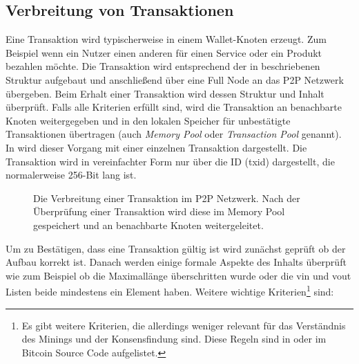 \documentclass[ngerman,runningheads,a4paper]{llncs}[2018/03/10]
\begin{document}
\subsection{Verbreitung von Transaktionen}\label{sec:transaktionsverbreitung}

Eine Transaktion wird typischerweise in einem Wallet-Knoten erzeugt. Zum Beispiel wenn ein Nutzer einen anderen für einen Service oder ein Produkt bezahlen möchte. Die Transaktion wird entsprechend der in  beschriebenen Struktur aufgebaut und anschließend über eine Full Node an das P2P Netzwerk übergeben. Beim Erhalt einer Transaktion wird dessen Struktur und Inhalt überprüft. Falls alle Kriterien erfüllt sind, wird die Transaktion an benachbarte Knoten weitergegeben und in den lokalen Speicher für unbestätigte Transaktionen übertragen (auch \textit{Memory Pool} oder \textit{Transaction Pool} genannt). In  wird dieser Vorgang mit einer einzelnen Transaktion dargestellt. Die Transaktion wird in vereinfachter Form nur über die ID (txid) dargestellt, die normalerweise 256-Bit lang ist.

\begin{figure}
  \centering
  \caption{Die Verbreitung einer Transaktion im P2P Netzwerk. Nach der Überprüfung einer Transaktion wird diese im Memory Pool gespeichert und an benachbarte Knoten weitergeleitet.}
  \label{fig:transactionPropagation}
\end{figure}

Um zu Bestätigen, dass eine Transaktion gültig ist wird zunächst geprüft ob der Aufbau korrekt ist. Danach werden einige formale Aspekte des Inhalts überprüft wie zum Beispiel ob die Maximallänge überschritten wurde oder die vin und vout Listen beide mindestens ein Element haben. Weitere wichtige Kriterien\footnote{Es gibt weitere Kriterien, die allerdings weniger relevant für das Verständnis des Minings und der Konsensfindung sind. Diese Regeln sind in \citep{bitcoinbook} oder im Bitcoin Source Code \citep{bitcoincore} aufgelistet.} sind:
\end{document}
